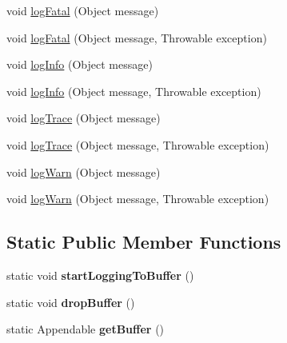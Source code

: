 \begin{DoxyCompactItemize}
void \mbox{\hyperlink{classcom_1_1mysql_1_1jdbc_1_1log_1_1_standard_logger_a667dcddbec69b9f552a2c765b5396d36}{log\+Fatal}} (Object message)
\item 
void \mbox{\hyperlink{classcom_1_1mysql_1_1jdbc_1_1log_1_1_standard_logger_a4e5b84fe2f897f169521ae8b712c5626}{log\+Fatal}} (Object message, Throwable exception)
\item 
void \mbox{\hyperlink{classcom_1_1mysql_1_1jdbc_1_1log_1_1_standard_logger_ac3056a38def26fc68c472fd56c6cfcab}{log\+Info}} (Object message)
\item 
void \mbox{\hyperlink{classcom_1_1mysql_1_1jdbc_1_1log_1_1_standard_logger_a4cfdd0fcd7f40b1dcd520c76a0b09235}{log\+Info}} (Object message, Throwable exception)
\item 
void \mbox{\hyperlink{classcom_1_1mysql_1_1jdbc_1_1log_1_1_standard_logger_af35b306462374638f8dc0fb03ae66965}{log\+Trace}} (Object message)
\item 
void \mbox{\hyperlink{classcom_1_1mysql_1_1jdbc_1_1log_1_1_standard_logger_a5e5a12d72648c2316f561808a2d1410a}{log\+Trace}} (Object message, Throwable exception)
\item 
void \mbox{\hyperlink{classcom_1_1mysql_1_1jdbc_1_1log_1_1_standard_logger_ab3a9b575254066c47662dd8489047afb}{log\+Warn}} (Object message)
\item 
void \mbox{\hyperlink{classcom_1_1mysql_1_1jdbc_1_1log_1_1_standard_logger_a53736a9dbaa1f110722baee2ca70020c}{log\+Warn}} (Object message, Throwable exception)
\end{DoxyCompactItemize}
\subsection*{Static Public Member Functions}
\begin{DoxyCompactItemize}
\item 
\mbox{\label{classcom_1_1mysql_1_1jdbc_1_1log_1_1_standard_logger_a37fa1c7c64a0d6f9282ab62214cd9351}} 
static void {\bfseries start\+Logging\+To\+Buffer} ()
\item 
\mbox{\label{classcom_1_1mysql_1_1jdbc_1_1log_1_1_standard_logger_a994278e42882d4c987be9c635fec1a4d}} 
static void {\bfseries drop\+Buffer} ()
\item 
\mbox{\label{classcom_1_1mysql_1_1jdbc_1_1log_1_1_standard_logger_a8d95ad77e5d75b86b89dc6d6b31b90c4}} 
static Appendable {\bfseries get\+Buffer} ()
\end{DoxyCompactItemize}
